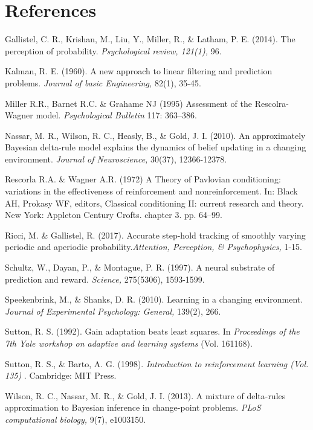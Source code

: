 \documentclass[jou,apacite]{apa6}
\begin{document}
\section{References}

\begin{hangparas}{.3in}{1}

Gallistel, C. R., Krishan, M., Liu, Y., Miller, R., \& Latham, P. E. (2014). The perception of probability. {\it Psychological review, 121(1),} 96.

Kalman, R. E. (1960). A new approach to linear filtering and prediction problems. {\it Journal of basic Engineering,} 82(1), 35-45.

Miller R.R., Barnet R.C. \& Grahame NJ (1995) Assessment of the Rescolra-Wagner model. {\it Psychological Bulletin} 117: 363–386.

Nassar, M. R., Wilson, R. C., Heasly, B., \& Gold, J. I. (2010). An approximately Bayesian delta-rule model explains the dynamics of belief updating in a changing environment. {\it Journal of Neuroscience,} 30(37), 12366-12378.

Rescorla R.A. \& Wagner A.R. (1972) A Theory of Pavlovian conditioning: variations in the effectiveness of reinforcement and nonreinforcement. In: Black AH, Prokasy WF, editors, Classical conditioning II: current research and theory. New York: Appleton Century Crofts. chapter 3. pp. 64–99. 

Ricci, M. \& Gallistel, R. (2017). Accurate step-hold tracking of smoothly varying periodic and aperiodic probability.{\it Attention, Perception, \& Psychophysics, }1-15.

Schultz, W., Dayan, P., \& Montague, P. R. (1997). A neural substrate of prediction and reward. {\it Science,} 275(5306), 1593-1599.

Speekenbrink, M., \& Shanks, D. R. (2010). Learning in a changing environment. {\it Journal of Experimental Psychology: General,} 139(2), 266.

Sutton, R. S. (1992). Gain adaptation beats least squares. In {\it Proceedings of the 7th Yale workshop on adaptive and learning systems} (Vol. 161168).

Sutton, R. S., \& Barto, A. G. (1998). {\it Introduction to reinforcement learning (Vol. 135)} . Cambridge: MIT Press.

Wilson, R. C., Nassar, M. R., \& Gold, J. I. (2013). A mixture of delta-rules approximation to Bayesian inference in change-point problems. {\it PLoS computational biology,} 9(7), e1003150.




\end{hangparas}


\onecolumn


\end{document}
